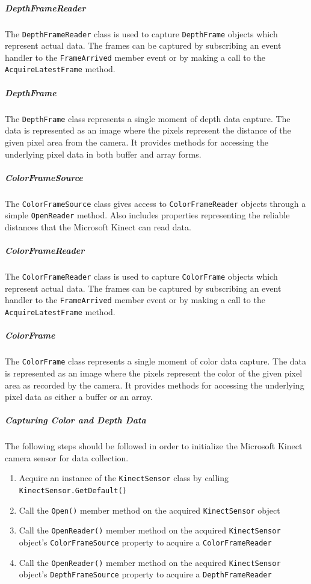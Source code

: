 \documentclass[12pt]{article}
\providecommand{\tightlist}{%
  \setlength{\itemsep}{0pt}\setlength{\parskip}{0pt}}
\begin{document}
\subparagraph{DepthFrameReader}\label{depthframereader}

The \texttt{DepthFrameReader} class is used to capture
\texttt{DepthFrame} objects which represent actual data. The frames can
be captured by subscribing an event handler to the \texttt{FrameArrived}
member event or by making a call to the \texttt{AcquireLatestFrame}
method.

\subparagraph{DepthFrame}\label{depthframe}

The \texttt{DepthFrame} class represents a single moment of depth data
capture. The data is represented as an image where the pixels represent
the distance of the given pixel area from the camera. It provides
methods for accessing the underlying pixel data in both buffer and array
forms.

\subparagraph{ColorFrameSource}\label{colorframesource}

The \texttt{ColorFrameSource} class gives access to
\texttt{ColorFrameReader} objects through a simple \texttt{OpenReader}
method. Also includes properties representing the reliable distances
that the Microsoft Kinect can read data.

\subparagraph{ColorFrameReader}\label{colorframereader}

The \texttt{ColorFrameReader} class is used to capture
\texttt{ColorFrame} objects which represent actual data. The frames can
be captured by subscribing an event handler to the \texttt{FrameArrived}
member event or by making a call to the \texttt{AcquireLatestFrame}
method.

\subparagraph{ColorFrame}\label{colorframe}

The \texttt{ColorFrame} class represents a single moment of color data
capture. The data is represented as an image where the pixels represent
the color of the given pixel area as recorded by the camera. It provides
methods for accessing the underlying pixel data as either a buffer or an
array.

\subparagraph{Capturing Color and Depth
Data}\label{capturing-color-and-depth-data-1}

The following steps should be followed in order to initialize the
Microsoft Kinect camera sensor for data collection.

\begin{enumerate}
\def\labelenumi{\arabic{enumi}.}
\tightlist
\item
  Acquire an instance of the \texttt{KinectSensor} class by calling
  \texttt{KinectSensor.GetDefault()}
\item
  Call the \texttt{Open()} member method on the acquired
  \texttt{KinectSensor} object
\item
  Call the \texttt{OpenReader()} member method on the acquired
  \texttt{KinectSensor} object's \texttt{ColorFrameSource} property to
  acquire a \texttt{ColorFrameReader}
\item
  Call the \texttt{OpenReader()} member method on the acquired
  \texttt{KinectSensor} object's \texttt{DepthFrameSource} property to
  acquire a \texttt{DepthFrameReader}
\end{enumerate}
\end{document}
